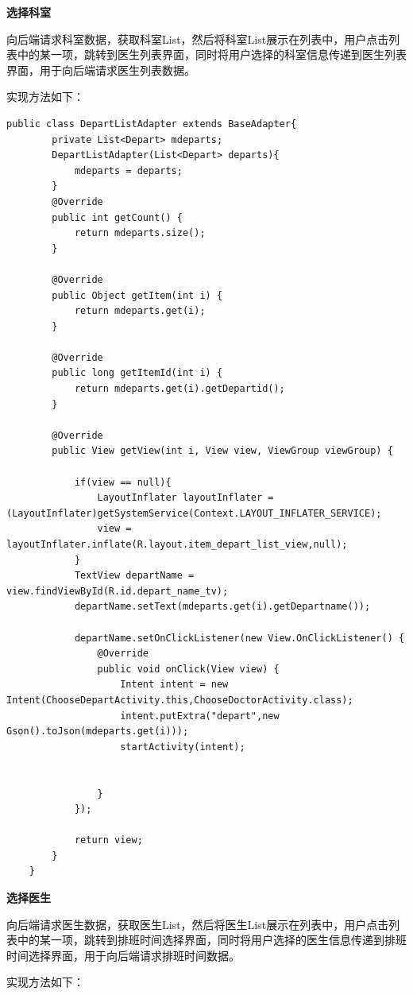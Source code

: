 \documentclass[UTF8,12pt]{article}
\begin{document}
\textbf{选择科室}

向后端请求科室数据，获取科室List，然后将科室List展示在列表中，用户点击列表中的某一项，跳转到医生列表界面，同时将用户选择的科室信息传递到医生列表界面，用于向后端请求医生列表数据。

实现方法如下：

\begin{lstlisting}[frame=shadowbox]
    public class DepartListAdapter extends BaseAdapter{
        private List<Depart> mdeparts;
        DepartListAdapter(List<Depart> departs){
            mdeparts = departs;
        }
        @Override
        public int getCount() {
            return mdeparts.size();
        }

        @Override
        public Object getItem(int i) {
            return mdeparts.get(i);
        }

        @Override
        public long getItemId(int i) {
            return mdeparts.get(i).getDepartid();
        }

        @Override
        public View getView(int i, View view, ViewGroup viewGroup) {

            if(view == null){
                LayoutInflater layoutInflater = (LayoutInflater)getSystemService(Context.LAYOUT_INFLATER_SERVICE);
                view = layoutInflater.inflate(R.layout.item_depart_list_view,null);
            }
            TextView departName = view.findViewById(R.id.depart_name_tv);
            departName.setText(mdeparts.get(i).getDepartname());

            departName.setOnClickListener(new View.OnClickListener() {
                @Override
                public void onClick(View view) {
                    Intent intent = new Intent(ChooseDepartActivity.this,ChooseDoctorActivity.class);
                    intent.putExtra("depart",new Gson().toJson(mdeparts.get(i)));
                    startActivity(intent);


                }
            });

            return view;
        }
    }
\end{lstlisting}

\textbf{选择医生}

向后端请求医生数据，获取医生List，然后将医生List展示在列表中，用户点击列表中的某一项，跳转到排班时间选择界面，同时将用户选择的医生信息传递到排班时间选择界面，用于向后端请求排班时间数据。

实现方法如下：
\end{document}
